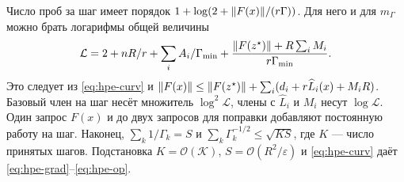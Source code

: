 Число проб за шаг имеет порядок
$1+\log(2+\lVert F(x)\rVert/(r\Gamma))$. Для него и для $m_\Gamma$
можно брать логарифмы общей величины
\[
 \mathcal L=2+nR/r+\sum_i A_i/\Gamma_{\min}
       +\frac{\lVert F(z^\star)\rVert+R\sum_i M_i}{r\Gamma_{\min}} .
\]
Это следует из \eqref{eq:hpe-curv} и
$\lVert F(x)\rVert\le\lVert F(z^\star)\rVert+
 \sum_i(d_i+r\widehat L_i(x)+M_iR)$.
Базовый член на шаг несёт множитель $\log^2\mathcal L$,
члены с $\widehat L_i$ и $M_i$ несут $\log\mathcal L$.
Один запрос $F(x)$ и до двух запросов для поправки
добавляют постоянную работу на шаг.
Наконец, $\sum_k1/\Gamma_k=S$ и
$\sum_k\Gamma_k^{-1/2}\le\sqrt{KS}$, где $K$ --- число
принятых шагов. Подстановка $K=\mathcal O(\mathcal K)$,
$S=\mathcal O(R^2/\varepsilon)$ и \eqref{eq:hpe-curv}
даёт \eqref{eq:hpe-grad}--\eqref{eq:hpe-op}.
